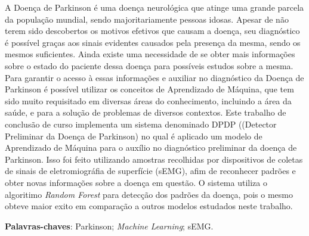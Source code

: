 \begin{resumo}
    A Doença de Parkinson é uma doença neurológica que atinge uma grande parcela da população mundial, sendo majoritariamente pessoas idosas. Apesar de não terem sido descobertos os motivos efetivos que causam a doença, seu diagnóstico é possível graças aos sinais evidentes causados pela presença da mesma, sendo os mesmos suficientes. Ainda existe uma necessidade de se obter mais informações sobre o estado do paciente dessa doença para possíveis estudos sobre a mesma. Para garantir o acesso à essas informações e auxiliar no diagnóstico da Doença de Parkinson é possível utilizar os conceitos de Aprendizado de Máquina, que tem sido muito requisitado em diversas áreas do conhecimento, incluindo a área da saúde, e para a solução de problemas de diversos contextos. Este trabalho de conclusão de curso implementa um sistema denominado DPDP ((Detector Preliminar da Doença de Parkinson) no qual é aplicado um modelo de Aprendizado de Máquina para o auxílio no diagnóstico preliminar da doença de Parkinson. Isso foi feito utilizando amostras recolhidas por dispositivos de coletas de sinais de eletromiográfia de superfície (sEMG), afim de reconhecer padrões e obter novas informações sobre a doença em questão. O sistema utiliza o algoritimo \textit{Random Forest} para detecção dos padrões da doença, pois o mesmo obteve maior exito em comparação a outros modelos estudados neste trabalho.

 \vspace{\onelineskip}
    
 \noindent
 \textbf{Palavras-chaves}: Parkinson; \textit{Machine Learning}; sEMG.
\end{resumo}
